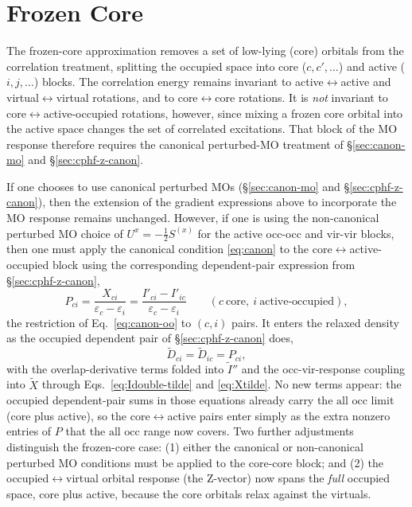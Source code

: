 \documentclass[12pt]{article}
\newcommand{\alloc}{\text{all occ}}   %
\begin{document}
\section{Frozen Core}
\label{sec:frozen-core}

The frozen-core approximation removes a set of low-lying (core) orbitals from
the correlation treatment, splitting the occupied space into core
($c,c',\dots$) and active ($i,j,\dots$) blocks.  The correlation energy remains
invariant to active$\leftrightarrow$active and virtual$\leftrightarrow$virtual
rotations, and to core$\leftrightarrow$core rotations.  It is {\em not}
invariant to core$\leftrightarrow$active-occupied rotations, however, since
mixing a frozen core orbital into the active space changes the set of
correlated excitations.  That block of the MO response therefore requires the
canonical perturbed-MO treatment of \S\ref{sec:canon-mo} and \S\ref{sec:cphf-z-canon}.

If one chooses to use canonical perturbed MOs (\S\ref{sec:canon-mo} and \S\ref{sec:cphf-z-canon}), then the extension
of the gradient expressions above to incorporate the MO response remains unchanged.
However, if one is using the non-canonical perturbed MO choice of 
$U^x=-\tfrac12 S^{(x)}$ for the active occ-occ and vir-vir blocks, then one must 
apply the canonical condition \eqref{eq:canon} to the
core$\leftrightarrow$active-occupied block using the corresponding
dependent-pair expression from \S\ref{sec:cphf-z-canon},
\begin{equation}
P_{ci} = \frac{X_{ci}}{\varepsilon_c-\varepsilon_i}
= \frac{I'_{ci}-I'_{ic}}{\varepsilon_c-\varepsilon_i}
\qquad(c\ \text{core},\ i\ \text{active-occupied}),
\label{eq:Pco}
\end{equation}
the restriction of Eq.~\eqref{eq:canon-oo} to $(c,i)$ pairs.  It enters the
relaxed density as the occupied dependent pair of \S\ref{sec:cphf-z-canon} does,
\begin{equation}
\tilde{D}_{ci}=\tilde{D}_{ic}=P_{ci},
\end{equation}
with the overlap-derivative terms folded into $\tilde{I}''$ and the occ-vir-response
coupling into $\tilde{X}$ through Eqs.~\eqref{eq:Idouble-tilde} and
\eqref{eq:Xtilde}.  No new terms appear: the occupied dependent-pair sums in those
equations already carry the $\alloc$ limit (core plus active), so the
core$\leftrightarrow$active pairs enter simply as the extra nonzero entries of $P$
that the $\alloc$ range now covers.  Two further
adjustments distinguish the frozen-core case: (1) 
either the canonical or non-canonical perturbed MO conditions must be applied
to the core-core block; and (2) the occupied$\leftrightarrow$virtual orbital
response (the Z-vector) now spans the {\em full} occupied space, core plus active,
because the core orbitals relax against the virtuals.
\end{document}
